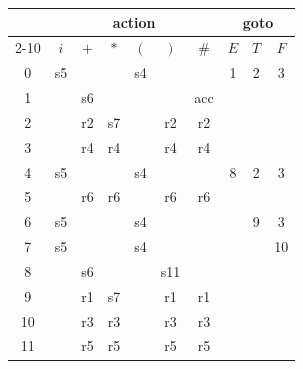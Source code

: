 \documentclass{jarticle}
\begin{document}
\begin{tabular}{|c||c|c|c|c|c|c|c|c|c|}\hline
   & \multicolumn{6}{c|}{{\sf action}} & \multicolumn{3}{c|}{{\sf goto}}\\\cline{2-10}
   &$i$&$+$&$\ast$&$($&$)$&$\#$&$E$&$T$&$F$\\\hline\hline
 0 & s5&   &      & s4&   &    & 1 & 2 & 3 \\\hline
 1 &   & s6&      &   &   &acc &   &   &   \\\hline
 2 &   & r2&  s7  &   & r2& r2 &   &   &   \\\hline
 3 &   & r4&  r4  &   & r4& r4 &   &   &   \\\hline
 4 & s5&   &      & s4&   &    & 8 & 2 & 3 \\\hline
 5 &   & r6&  r6  &   & r6& r6 &   &   &   \\\hline
 6 & s5&   &      & s4&   &    &   & 9 & 3 \\\hline
 7 & s5&   &      & s4&   &    &   &   & 10\\\hline
 8 &   & s6&      &   &s11&    &   &   &   \\\hline
 9 &   & r1&  s7  &   & r1& r1 &   &   &   \\\hline
10 &   & r3&  r3  &   & r3& r3 &   &   &   \\\hline
11 &   & r5&  r5  &   & r5& r5 &   &   &   \\\hline 
\end{tabular}
\end{document}
